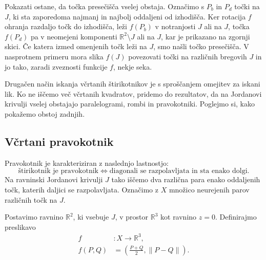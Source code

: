 \documentclass[mat1]{fmfdelo}
\newcommand{\R}{\mathbb R}
\begin{document}
Pokazati ostane, da točka presečišča vselej obstaja. Označimo s $P_b$ in $P_d$ točki na $J$, ki sta zaporedoma najmanj in najbolj oddaljeni od izhodišča. Ker rotacija $f$ ohranja razdaljo točk do izhodišča, leži $f(P_b)$ v notranjosti $J$ ali na $J$, točka $f(P_d)$ pa v neomejeni komponenti $\R^2 \setminus J$ ali na $J$, kar je prikazano na zgornji skici. Če katera izmed omenjenih točk leži na $J$, smo našli točko presečišča. V nasprotnem primeru mora slika $f(J)$ povezovati točki na različnih bregovih $J$ in jo tako, zaradi zveznosti funkcije $f$, nekje seka.
\endproof

Drugačen način iskanja včrtanih štirikotnikov je s sproščanjem omejitev za iskani lik. Ko ne iščemo več včrtanih kvadratov, pridemo do rezultatov, da na Jordanovi krivulji vselej obstajajo paralelogrami, rombi in pravokotniki. Poglejmo si, kako pokažemo obstoj zadnjih.

\subsection{Včrtani pravokotnik}
Pravokotnik je karakteriziran z naslednjo lastnostjo:
\begin{equation}
\label{prop:pravokotnik}
\text{štirikotnik je pravokotnik} \iff \text{diagonali se razpolavljata in sta enako dolgi}.
\end{equation}
Na ravninski Jordanovi krivulji $J$ tako iščemo dva različna para enako oddaljenih točk, katerih daljici se razpolavljata. Označimo z $X$ množico neurejenih parov različnih točk na $J$.

Postavimo ravnino $\R^2$, ki vsebuje $J$, v prostor $\R^3$ kot ravnino $z = 0$. Definirajmo preslikavo 
\begin{align*}
f &\colon X \to \R^3, \\
f({P, Q}) &= \left( \frac{P+Q}{2} , \|P-Q\| \right).
\end{align*}
\end{document}
